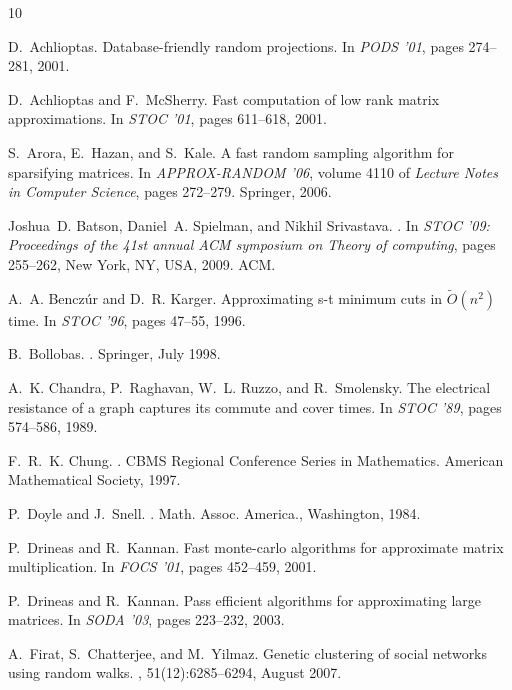 \documentclass[11pt]{article}
\begin{document}
\begin{thebibliography}{10}

D.~Achlioptas.
\newblock Database-friendly random projections.
\newblock In {\em PODS '01}, pages 274--281, 2001.

D.~Achlioptas and F.~McSherry.
\newblock Fast computation of low rank matrix approximations.
\newblock In {\em STOC '01}, pages 611--618, 2001.

S.~Arora, E.~Hazan, and S.~Kale.
\newblock A fast random sampling algorithm for sparsifying matrices.
\newblock In {\em APPROX-RANDOM '06}, volume 4110 of {\em Lecture Notes in
  Computer Science}, pages 272--279. Springer, 2006.

Joshua~D. Batson, Daniel~A. Spielman, and Nikhil Srivastava.
.
\newblock In {\em STOC '09: Proceedings of the 41st annual ACM symposium on
  Theory of computing}, pages 255--262, New York, NY, USA, 2009. ACM.


A.~A. Bencz{\'u}r and D.~R. Karger.
\newblock Approximating s-t minimum cuts in $\tilde{O}(n^2)$ time.
\newblock In {\em STOC '96}, pages 47--55, 1996.

B.~Bollobas.
.
\newblock Springer, July 1998.

A.~K. Chandra, P.~Raghavan, W.~L. Ruzzo, and R.~Smolensky.
\newblock The electrical resistance of a graph captures its commute and cover
  times.
\newblock In {\em STOC '89}, pages 574--586, 1989.

F.~R.~K. Chung.
.
\newblock CBMS Regional Conference Series in Mathematics. American Mathematical
  Society, 1997.

P.~Doyle and J.~Snell.
.
\newblock Math. Assoc. America., Washington, 1984.

P.~Drineas and R.~Kannan.
\newblock Fast monte-carlo algorithms for approximate matrix multiplication.
\newblock In {\em FOCS '01}, pages 452--459, 2001.

P.~Drineas and R.~Kannan.
\newblock Pass efficient algorithms for approximating large matrices.
\newblock In {\em SODA '03}, pages 223--232, 2003.

A.~Firat, S.~Chatterjee, and M.~Yilmaz.
\newblock Genetic clustering of social networks using random walks.
, 51(12):6285--6294,
  August 2007.


\end{thebibliography}
\end{document}
